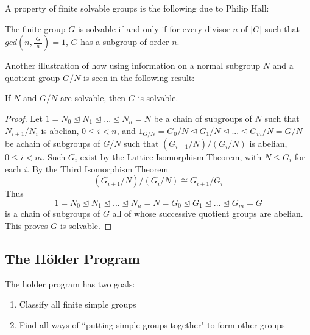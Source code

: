 \documentclass[12pt, a4paper, oneside, openright, titlepage]{book}
\begin{document}
A property of finite solvable groups is the following due to Philip Hall: 

\begin{thm}
    The finite group $G$ is solvable if and only if for every divisor $n$ of $|G|$ such that $gcd\left(n,\frac{|G|}{n}\right) = 1$, $G$ has a subgroup of order $n$.
\end{thm}

Another illustration of how using information on a normal subgroup $N$ and a quotient group $G/N$ is seen in the following result:

\begin{prop}
    If $N$ and $G/N$ are solvable, then $G$ is solvable.
\end{prop}
\begin{proof}
    Let $1 = N_0 \trianglelefteq N_1 \trianglelefteq ... \trianglelefteq N_n = N$ be a chain of subgroups of $N$ such that $N_{i+1}/N_i$ is abelian, $0 \leq i < n$, and $1_{G/N} = G_0/N\trianglelefteq G_1/N\trianglelefteq ... \trianglelefteq G_m/N = G/N$ be achain of subgroups of $G/N$ such that $(G_{i+1}/N)/(G_i/N)$ is abelian, $0 \leq i < m$. Such $G_i$ exist by the Lattice Isomorphism Theorem, with $N \leq G_i$ for each $i$. By the Third Isomorphism Theorem \begin{equation*}
        (G_{i+1}/N)/(G_i/N) \cong G_{i+1}/G_i
    \end{equation*}
    Thus \begin{equation*}
        1 = N_0 \trianglelefteq N_1 \trianglelefteq ... \trianglelefteq N_n = N = G_0 \trianglelefteq G_1 \trianglelefteq ... \trianglelefteq G_m = G
    \end{equation*}
    is a chain of subgroups of $G$ all of whose successive quotient groups are abelian. This proves $G$ is solvable.
\end{proof}





\subsection{The H\"{o}lder Program}

The holder program has two goals: \begin{enumerate}
    \item Classify all finite simple groups
    \item Find all ways of ``putting simple groups together" to form other groups
\end{enumerate}
\end{document}
